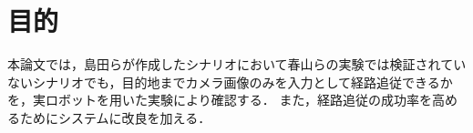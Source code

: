 \section{目的}
本論文では，島田らが作成したシナリオにおいて春山らの実験では検証されていないシナリオでも，目的地までカメラ画像のみを入力として経路追従できるかを，実ロボットを用いた実験により確認する．
また，経路追従の成功率を高めるためにシステムに改良を加える．